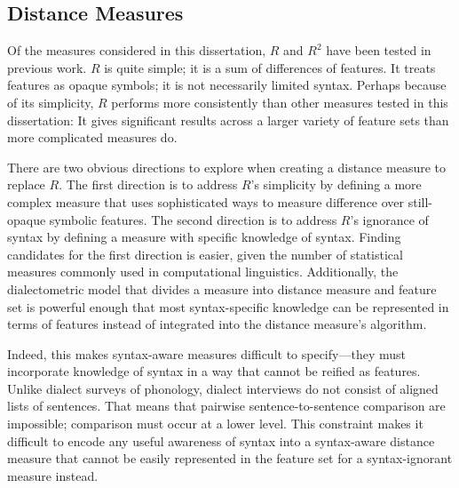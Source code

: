 \subsection{Distance Measures}

Of the measures considered in this dissertation, $R$ and $R^2$ have
been tested in previous work. $R$ is quite simple; it is a sum of
differences of features. It treats features as opaque symbols; it is
not necessarily limited syntax. Perhaps because of its simplicity, $R$
performs more consistently than other measures tested in this
dissertation: It gives significant results across a larger variety of
feature sets than more complicated measures do.



There are two obvious directions to explore when creating a distance
measure to replace $R$. The first direction is to address $R$'s
simplicity by defining a more complex measure that uses sophisticated
ways to measure difference over still-opaque symbolic features. The
second direction is to address $R$'s ignorance of syntax by defining a
measure with specific knowledge of syntax. Finding candidates for the
first direction is easier, given the number of statistical measures
commonly used in computational linguistics. Additionally, the
dialectometric model that divides a measure into distance measure and
feature set is powerful enough that most syntax-specific knowledge can
be represented in terms of features instead of integrated into the
distance measure's algorithm.

Indeed, this makes syntax-aware measures difficult to
specify---they must incorporate knowledge of syntax in a way that
cannot be reified as features. Unlike dialect surveys of phonology,
dialect interviews do not consist of aligned lists of sentences. That
means that pairwise sentence-to-sentence comparison are impossible;
comparison must occur at a lower level. This constraint makes it
difficult to encode any useful awareness of syntax into a syntax-aware
distance measure that cannot be easily represented in the feature set
for a syntax-ignorant measure instead.

